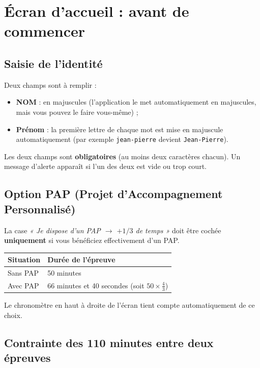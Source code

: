 \documentclass[11pt,a4paper]{article}
\begin{document}
\section{Écran d'accueil : avant de commencer}

\subsection{Saisie de l'identité}

Deux champs sont à remplir :
\begin{itemize}
  \item \textbf{NOM} : en majuscules (l'application le met automatiquement en
        majuscules, mais vous pouvez le faire vous-même) ;
  \item \textbf{Prénom} : la première lettre de chaque mot est mise en
        majuscule automatiquement (par exemple \texttt{jean-pierre} devient
        \texttt{Jean-Pierre}).
\end{itemize}

\begin{attention}
Les deux champs sont \textbf{obligatoires} (au moins deux caractères chacun).
Un message d'alerte apparaît si l'un des deux est vide ou trop court.
\end{attention}

\subsection{Option PAP (Projet d'Accompagnement Personnalisé)}

La case \emph{« Je dispose d'un PAP \(\rightarrow\) \(+1/3\) de temps »} doit
être cochée \textbf{uniquement} si vous bénéficiez effectivement d'un PAP.

\begin{center}
\begin{tabular}{ll}
\toprule
\textbf{Situation} & \textbf{Durée de l'épreuve} \\
\midrule
Sans PAP  & 50 minutes \\
Avec PAP  & 66 minutes et 40 secondes (soit \(50 \times \tfrac{4}{3}\)) \\
\bottomrule
\end{tabular}
\end{center}

Le chronomètre en haut à droite de l'écran tient compte automatiquement de ce
choix.

\subsection{Contrainte des 110 minutes entre deux épreuves}
\end{document}

